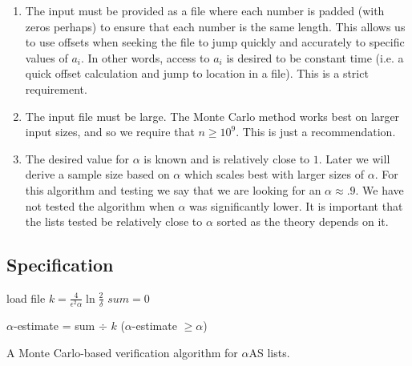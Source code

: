 \documentclass[11pt]{article}
\begin{document}
\begin{enumerate}
\item The input must be provided as a file where each number is padded (with zeros perhaps) to ensure that each number is the same length. This allows us to use offsets when seeking the file to jump quickly and accurately to specific values of $a_i$. In other words, access to $a_i$ is desired to be constant time (i.e. a quick offset calculation and jump to location in a file). This is a strict requirement. 

\item The input file must be large. The Monte Carlo method works best on larger input sizes, and so we require that $n \geq 10^9$. This is just a recommendation.

\item The desired value for $\alpha$ is known and is relatively close to $1$. Later we will derive a sample size based on $\alpha$ which scales best with larger sizes of $\alpha$. For this algorithm and testing we say that we are looking for an $\alpha \approx .9$. We have not tested the algorithm when $\alpha$ was significantly lower. It is important that the lists tested be relatively close to $\alpha$ sorted as the theory depends on it. 
\end{enumerate}

\subsection{Specification}

\begin{algorithm}[H]
 
 	load file\;
 	$k = \frac{4}{\epsilon^2 \alpha} \ln \frac{2}{\delta}$\;
	$sum = 0$\; 
 
 	
 	$\alpha$-estimate = sum $\div$ $k$\;
 	\Return ($\alpha$-estimate $\geq \alpha$)\;
 	\vspace{.15in}
 	\caption{A Monte Carlo-based verification algorithm for $\alpha$AS lists.}
\end{algorithm}
\end{document}
